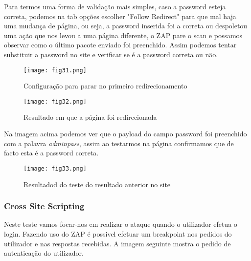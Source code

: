Para termos uma forma de validação mais simples, caso a password esteja correta, podemos na tab opções escolher "Follow Redirect" para que mal haja uma mudança de página, ou seja, a password inserida foi a correta ou despoletou uma ação que nos levou a uma página diferente, o ZAP pare o scan e possamos observar como o último pacote enviado foi preenchido. Assim podemos tentar substituir a password no site e verificar se é a password correta ou não.

\begin{figure}[H]

  \centering

  \texttt{[image: fig31.png]}

  \caption{Configuração para parar no primeiro redirecionamento}

\end{figure}
\begin{figure}[H]

  \centering

  \texttt{[image: fig32.png]}

  \caption{Resultado em que a página foi redirecionada}

\end{figure}
 Na imagem acima podemos ver que o payload do campo password foi preenchido com a palavra \textit{adminpass}, assim ao testarmos na página confirmamos que de facto esta é a password correta.

\begin{figure}[H]

  \centering

  \texttt{[image: fig33.png]}

  \caption{Resultadod do teste do resultado anterior no site}

\end{figure}




\subsubsection{Cross Site Scripting}

Neste teste vamos focar-nos em realizar o ataque quando o utilizador efetua o login.
Fazendo uso do ZAP é possivel efetuar um breakpoint nos pedidos do utilizador e nas respostas recebidas. A imagem seguinte mostra o pedido de autenticação do utilizador.

